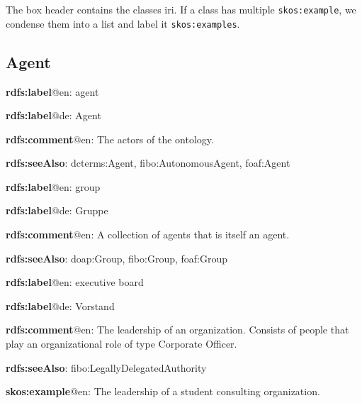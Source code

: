 \documentclass[a4paper, DIV=13, BCOR=0cm]{scrbook}
\newcommand{\relation}[1]{\texttt{#1}}
\begin{document}
The box header contains the classes \gls{iri}. If a class has multiple \relation{skos:example}, we condense them into a list and label it \relation{skos:examples}.

\subsection{Agent}
\begin{mdframed}[style=onto, frametitle={Agent}]
	{%
		\begin{compactitem}
			\item \textbf{rdfs:label}@en: agent
			\item \textbf{rdfs:label}@de: Agent
			\item \textbf{rdfs:comment}@en: The actors of the ontology.
			\item \textbf{rdfs:seeAlso}: dcterms:Agent, fibo:AutonomousAgent, foaf:Agent
		\end{compactitem}
	} %
\end{mdframed}

\begin{mdframed}[style=onto-1, frametitle={Group}]
	{%
		\begin{compactitem}
			\item \textbf{rdfs:label}@en: group
			\item \textbf{rdfs:label}@de: Gruppe
			\item \textbf{rdfs:comment}@en: A collection of agents that is itself an agent.
			\item \textbf{rdfs:seeAlso}: doap:Group, fibo:Group, foaf:Group
		\end{compactitem}
	} %
\end{mdframed}

\begin{mdframed}[style=onto-2, frametitle={Executive\_Board}]
	{%
		\begin{compactitem}
			\item \textbf{rdfs:label}@en: executive board
			\item \textbf{rdfs:label}@de: Vorstand
			\item \textbf{rdfs:comment}@en: The leadership of an organization. Consists of people that play an organizational role of type Corporate Officer.
			\item \textbf{rdfs:seeAlso}: fibo:LegallyDelegatedAuthority
			\item \textbf{skos:example}@en: The leadership of a student consulting organization.
		\end{compactitem}
	} %
\end{mdframed}
\end{document}

